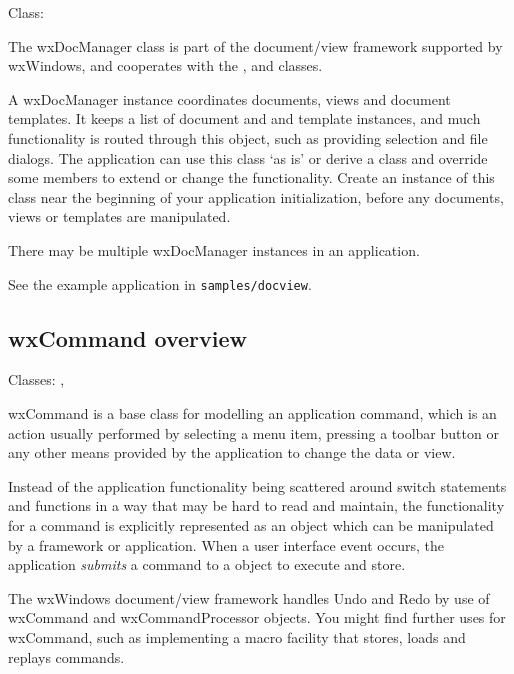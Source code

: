 Class: 

The wxDocManager class is part of the document/view framework supported by wxWindows,
and cooperates with the , \rtfsp
and  classes.

A wxDocManager instance coordinates documents, views and document templates. It keeps a list of document and
and template instances, and much functionality is routed through this object, such
as providing selection and file dialogs. The application can use this class `as is' or
derive a class and override some members to extend or change the functionality.
Create an instance of this class near the beginning of your application initialization,
before any documents, views or templates are manipulated.

There may be multiple wxDocManager instances in an application.

See the example application in {\tt samples/docview}.

\subsection{wxCommand overview}\label{wxcommandoverview}


Classes: , 

wxCommand is a base class for modelling an application command,
which is an action usually performed by selecting a menu item, pressing
a toolbar button or any other means provided by the application to
change the data or view.

Instead of the application functionality being scattered around
switch statements and functions in a way that may be hard to
read and maintain, the functionality for a command is explicitly represented
as an object which can be manipulated by a framework or application.
When a user interface event occurs, the application {\it submits} a command
to a  object to execute and
store.

The wxWindows document/view framework handles Undo and Redo by use of
wxCommand and wxCommandProcessor objects. You might find further uses
for wxCommand, such as implementing a macro facility that stores, loads
and replays commands.

